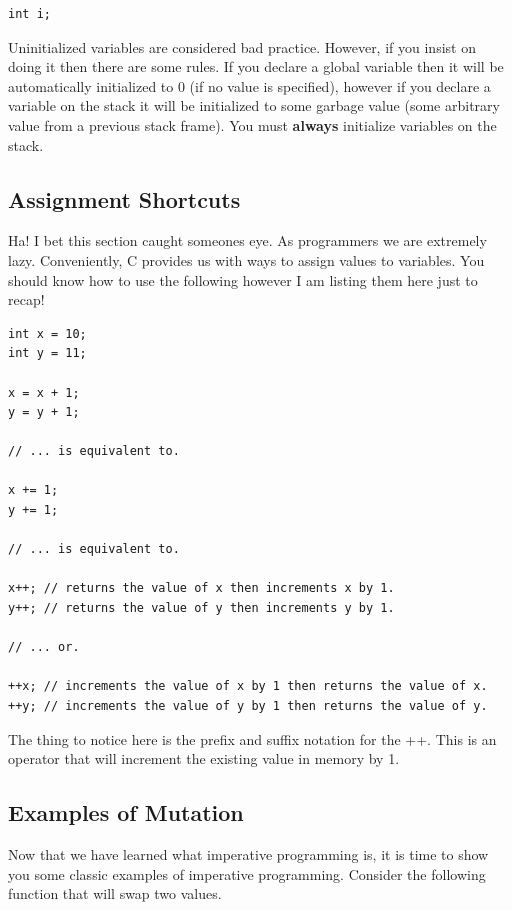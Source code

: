 \documentclass[12pt,extarticle]{article}
\begin{document}
\lstset {
	language=c
}
\begin{lstlisting}
int i;
\end{lstlisting}

Uninitialized variables are considered bad practice. However, if you insist on doing it then there are some rules. If you declare a global variable then it will be automatically initialized to 0 (if no value is specified), however if you declare a variable on the stack it will be initialized to some garbage value (some arbitrary value from a previous stack frame). You must \textbf{always} initialize variables on the stack.

\subsection{Assignment Shortcuts}

Ha! I bet this section caught someones eye. As programmers we are extremely lazy. Conveniently, C provides us with ways to assign values to variables. You should know how to use the following however I am listing them here just to recap!\\

\lstset {
	language=c
}
\begin{lstlisting}
int x = 10;
int y = 11;

x = x + 1;
y = y + 1;

// ... is equivalent to.

x += 1;
y += 1;

// ... is equivalent to.

x++; // returns the value of x then increments x by 1.
y++; // returns the value of y then increments y by 1.

// ... or.

++x; // increments the value of x by 1 then returns the value of x.
++y; // increments the value of y by 1 then returns the value of y.
\end{lstlisting}

The thing to notice here is the prefix and suffix notation for the ++. This is an operator that will increment the existing value in memory by 1.

\subsection{Examples of Mutation}

Now that we have learned what imperative programming is, it is time to show you some classic examples of imperative programming. Consider the following function that will swap two values.\\
\end{document}
